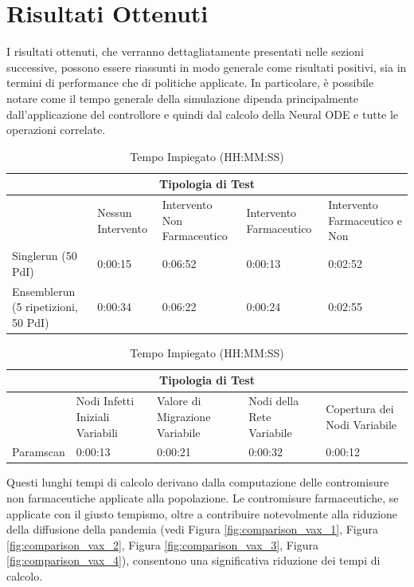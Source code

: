 \section{Risultati Ottenuti}

I risultati ottenuti, che verranno dettagliatamente presentati 
nelle sezioni successive, possono essere riassunti in modo 
generale come risultati positivi, sia in termini di performance 
che di politiche applicate. In particolare, è possibile notare come 
il tempo generale della simulazione dipenda principalmente 
dall'applicazione del controllore e quindi dal calcolo della 
Neural ODE e tutte le operazioni correlate.

\begin{table}[htb]
    \centering
    \caption{Tempo Impiegato (HH:MM:SS)}
    \begin{tabular}{|p{2.57cm}||p{2.57cm}|p{2.57cm}|p{2.57cm}|p{2.57cm}|}
        \hline
        \multicolumn{5}{|c|}{Tipologia di Test} \\
        \hline
        & Nessun Intervento & Intervento Non Farmaceutico & Intervento Farmaceutico & Intervento Farmaceutico e Non \\
        \hline
        Singlerun (50 PdI) & 0:00:15 & 0:06:52 & 0:00:13 & 0:02:52 \\
        Ensemblerun (5 ripetizioni, 50 PdI) & 0:00:34 & 0:06:22 & 0:00:24 & 0:02:55 \\
        \hline
    \end{tabular}
\end{table}

\begin{table}[htb]
    \centering
    \caption{Tempo Impiegato (HH:MM:SS)}
    \begin{tabular}{|p{2.57cm}||p{2.57cm}|p{2.57cm}|p{2.57cm}|p{2.57cm}|}
        \hline
        \multicolumn{5}{|c|}{Tipologia di Test} \\
        \hline
        & Nodi Infetti Iniziali Variabili & Valore di Migrazione Variabile & Nodi della Rete Variabile & Copertura dei Nodi Variabile \\
        \hline
        Paramscan & 0:00:13 & 0:00:21 & 0:00:32 & 0:00:12 \\
        \hline
    \end{tabular}
\end{table}

Questi lunghi tempi di calcolo derivano dalla computazione delle 
contromisure non farmaceutiche applicate alla popolazione. 
Le contromisure farmaceutiche, se applicate con il giusto tempismo, 
oltre a contribuire notevolmente alla riduzione della diffusione 
della pandemia (vedi Figura \ref{fig:comparison_vax_1}, Figura 
\ref{fig:comparison_vax_2}, Figura \ref{fig:comparison_vax_3}, 
Figura \ref{fig:comparison_vax_4}), consentono una significativa 
riduzione dei tempi di calcolo.

